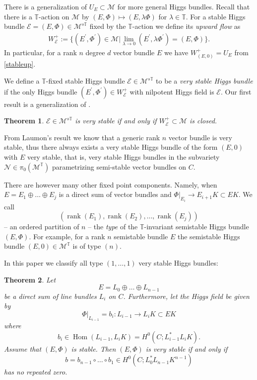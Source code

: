 \documentclass[12pt]{article}
\numberwithin{equation}{section}
\newtheorem{theorem}{Theorem}
\theoremstyle{remark}
\theoremstyle{definition}
\numberwithin{theorem}{section}
\def\beq{\begin{eqnarray}}
\def\eeq{\end{eqnarray}}
\def\calE{{\mathcal E}}
\DeclareMathOperator{\Hom}{Hom}
\DeclareMathOperator{\rank}{rank}
\def\calN{{\mathcal{N}}}
\def\M{{\mathcal{M}}}
\newcommand{\T}{{\mathbb{T}}}
\renewcommand{\1}{\mathbbm{1}}
\begin{document}
There is a generalization of $U_{E}\subset \M$ for more general Higgs bundles. Recall that there is a $\T$-action on $\M$ by $(E,\Phi)\mapsto (E,\lambda\Phi)$ for $\lambda\in \T$. For a stable Higgs bundle
$\calE=(E,\Phi)\in \M^{s\T}$ fixed by the $\T$-action we define its {\em upward flow} as \beq\label{upwardflow}W^+_\calE:=\{(E^\prime,\Phi^\prime)\in \M | \lim_{\lambda \to 0} (E^\prime,\lambda\Phi^\prime)=(E,\Phi)\}.\eeq
In particular, for a rank $n$ degree $d$ vector bundle $E$ we have $W^+_{(E,0)}=U_E$ from \eqref{stableup}. 

We define a $\T$-fixed stable Higgs bundle $\calE\in \M^{s\T}$ to be a {\em very stable Higgs bundle} if the only Higgs bundle $(E^\prime,\Phi^\prime)\in W^+_\calE$ with nilpotent Higgs field is $\calE$.  Our first result is a generalization of \cite[Theorem 1.1]{pauly-peon-nieto}. \begin{theorem}\label{mainclosed}  $\calE\in \M^{s\T}$ is very stable if and only if $W^+_{\calE}\subset \M$ is closed. 
\end{theorem}

From Laumon's result we know that a generic rank $n$ vector bundle is very stable, thus there always exists a very stable Higgs bundle of the form  $(E,0)$ with $E$ very stable, that is,  very stable Higgs  bundles in  the subvariety $\calN\in \pi_0(\M^\T)$ parametrizing semi-stable vector bundles on $C$. 

There are however many other fixed point components. Namely, when  $E=E_1\oplus\dots \oplus E_j$ is a direct sum of vector bundles and $\Phi|_{E_i}\to E_{i+1}K\subset EK$. We call $$(\rank(E_1),\rank(E_2),\dots,\rank(E_j))$$ -- an ordered partition of $n$ -- the {\em type} of the $\T$-invariant semistable Higgs bundle $(E,\Phi)$. For example, for a rank $n$ semistable bundle $E$ the semistable Higgs bundle $(E,0)\in \M^\T$ is of type $(n)$. 

In this paper we  classify all type $(1,\dots,1)$ very stable Higgs bundles:
\begin{theorem} \label{maintype111} Let $$E=L_0\oplus \dots \oplus L_{n-1}$$ be a direct sum of line bundles $L_i$ on $C$. Furthermore, let the Higgs field be given by $$\Phi|_{L_{i-1}}=b_i : L_{i-1}\to L_{i}K\subset EK$$ where $$b_i\in \Hom(L_{i-1},L_{i}K)=H^0(C;L_{i-1}^*L_{i}K).$$ Assume that $(E,\Phi)$ is stable. Then $(E,\Phi)$ is very stable if and only if $$b=b_{n-1}\circ \dots \circ b_1\in H^0(C;L_0^*L_{n-1}K^{n-1})$$ has no repeated zero. 
\end{theorem}
\end{document}
